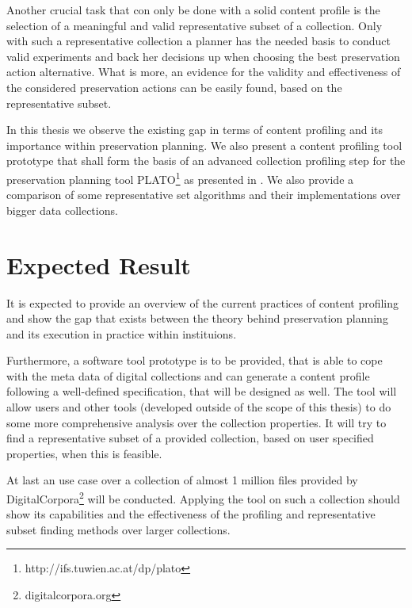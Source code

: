 \documentclass[a4paper,12pt]{scrartcl} %
\begin{document}
Another crucial task that con only be done with a solid content profile is the selection of a meaningful and valid representative subset of a collection. Only with such a representative collection a planner 
has the needed basis to conduct valid experiments and back her decisions up when choosing the best
preservation action alternative. What is more, an evidence for the validity and effectiveness of the considered preservation actions can be easily found, based on the representative subset.

In this thesis we observe the existing gap in terms of content profiling and its importance within preservation
planning. We also present a content profiling tool prototype that shall form the basis of an advanced collection profiling step for the preservation planning tool PLATO\footnote{http://ifs.tuwien.ac.at/dp/plato} as presented in \cite{Becker:2008:PSO:1378889.1378954}. We also provide a comparison of some representative
set algorithms and their implementations over bigger data collections.

\section*{Expected Result}
It is expected to provide an overview of the current practices of content profiling and show the gap that exists between the theory behind preservation planning and its execution in practice within instituions. 

Furthermore, a software tool prototype is to be provided, that is able to cope with the meta data of digital collections and can generate a content profile following a well-defined specification, that will be designed as well. The tool will allow users and other tools (developed outside of the scope of this thesis) to do some more comprehensive analysis over the collection properties. It will try to find a representative subset of a provided collection, based on user specified properties, when this is feasible.

At last an use case over a collection of almost 1 million files provided by DigitalCorpora\footnote{digitalcorpora.org} will be conducted. Applying the tool on such a collection should show its capabilities and the effectiveness of the profiling and representative subset finding methods over larger collections.
\end{document}
